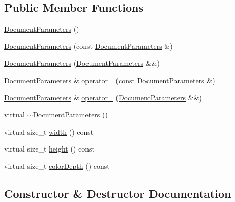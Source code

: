 \subsection*{Public Member Functions}
\begin{DoxyCompactItemize}
\item 
\hyperlink{classGraphicalEditorCore_1_1DocumentParameters_a89df3a7acba401ec3c636d599d40341f}{Document\+Parameters} ()
\item 
\hyperlink{classGraphicalEditorCore_1_1DocumentParameters_ad34fb74cda0ad52bc38678875ce32c91}{Document\+Parameters} (const \hyperlink{classGraphicalEditorCore_1_1DocumentParameters}{Document\+Parameters} \&)
\item 
\hyperlink{classGraphicalEditorCore_1_1DocumentParameters_af797b5c95963fdafdd2253bb4d152c21}{Document\+Parameters} (\hyperlink{classGraphicalEditorCore_1_1DocumentParameters}{Document\+Parameters} \&\&)
\item 
\hyperlink{classGraphicalEditorCore_1_1DocumentParameters}{Document\+Parameters} \& \hyperlink{classGraphicalEditorCore_1_1DocumentParameters_a084ca6d2aafc7e65b401b2e62b0a16e4}{operator=} (const \hyperlink{classGraphicalEditorCore_1_1DocumentParameters}{Document\+Parameters} \&)
\item 
\hyperlink{classGraphicalEditorCore_1_1DocumentParameters}{Document\+Parameters} \& \hyperlink{classGraphicalEditorCore_1_1DocumentParameters_a947b1cc43448286d07300fd7b9eeb722}{operator=} (\hyperlink{classGraphicalEditorCore_1_1DocumentParameters}{Document\+Parameters} \&\&)
\item 
virtual \hyperlink{classGraphicalEditorCore_1_1DocumentParameters_a4ea3a0d935da5c124d9989fd686d6d70}{$\sim$\+Document\+Parameters} ()
\item 
virtual size\+\_\+t \hyperlink{classGraphicalEditorCore_1_1DocumentParameters_af84100459d1e49474e57e5b7b16f1750}{width} () const 
\item 
virtual size\+\_\+t \hyperlink{classGraphicalEditorCore_1_1DocumentParameters_ab28b51581bade5d1b1a4122b347995da}{height} () const 
\item 
virtual size\+\_\+t \hyperlink{classGraphicalEditorCore_1_1DocumentParameters_ae7ebe626b5470cbee8b36fb2e532bc98}{color\+Depth} () const 
\end{DoxyCompactItemize}


\subsection{Constructor \& Destructor Documentation}
